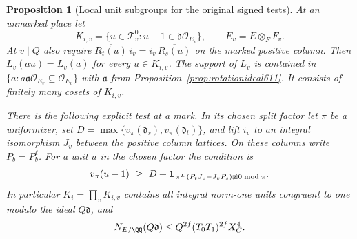 \documentclass[a4paper,11pt]{article}
\newtheorem{proposition}{Proposition}[section]
\theoremstyle{definition}
\theoremstyle{remark}
\numberwithin{equation}{section}
\begin{document}
\begin{proposition}[Local unit subgroups for the original signed tests]
\leavevmode\label{prop:rotationunits612}
At an unmarked place let
\[
 K_{i,v}=\{u\in\mathcal T_v^0:u-1\in\mathfrak d\mathcal O_{E_v}\},
                  \qquad E_v=E\otimes_F F_v .
\]
At \(v\mid Q\) also require
\(\overline{R_t(u)}\,i_v=i_v\,\overline{R_s(u)}\) on the marked
positive column. Then \(L_v(au)=L_v(a)\) for every \(u\in K_{i,v}\).
The support of \(L_v\) is contained in
\(\{a:a\mathfrak a\mathcal O_{E_v}\subseteq\mathcal O_{E_v}\}\)
with \(\mathfrak a\) from Proposition~\ref{prop:rotationideal611}.
It consists of finitely many cosets of \(K_{i,v}\).

There is the following explicit test at a mark. In its chosen
split factor let \(\pi\) be a uniformizer, set
\(D=\max\{v_\pi(\mathfrak d_s),v_\pi(\mathfrak d_t)\}\), and
lift \(i_v\) to an integral isomorphism \(J_v\) between the
positive column lattices. On these columns write \(P_b=P_b^\ell\).
For a unit \(u\) in the chosen factor the condition is
\[
 v_\pi(u-1)\ \ge\ D+
  {\bf1}_{\,\pi^D(P_tJ_v-J_vP_s)\not\equiv0\bmod\pi}.
\]
In particular \(K_i=\prod_vK_{i,v}\) contains all integral
norm-one units congruent to one modulo the ideal \(Q\mathfrak d\),
and
\[
     N_{E/\QQ}(Q\mathfrak d)
              \le Q^{2f}(T_0T_1)^{2f} X_C^4 .
\]
\end{proposition}
\end{document}
